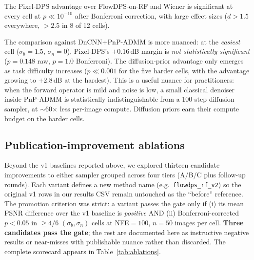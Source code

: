 \documentclass{article}
\begin{document}
The Pixel-DPS advantage over FlowDPS-on-RF and Wiener is significant
at every cell at $p \ll 10^{-10}$ after Bonferroni correction, with
large effect sizes ($d > 1.5$ everywhere, $> 2.5$ in 8 of 12 cells).

The comparison against DnCNN$+$PnP-ADMM is more nuanced: at the
\emph{easiest} cell ($\sigma_b{=}1.5$, $\sigma_n{=}0$), Pixel-DPS's
$+0.16$\,dB margin is \emph{not statistically significant}
($p{=}0.148$ raw, $p{=}1.0$ Bonferroni). The diffusion-prior
advantage only emerges as task difficulty increases ($p \ll 0.001$
for the five harder cells, with the advantage growing to $+2.8$\,dB
at the hardest). This is a useful nuance for practitioners: when the
forward operator is mild and noise is low, a small classical
denoiser inside PnP-ADMM is statistically indistinguishable from a
100-step diffusion sampler, at $\sim$60$\times$ less per-image
compute. Diffusion priors earn their compute budget on the
harder cells.

\subsection{Publication-improvement ablations}\label{sec:ablations}

Beyond the v1 baselines reported above, we explored thirteen
candidate improvements to either sampler grouped across four tiers
(A/B/C plus follow-up rounds). Each variant defines a new method
name (e.g.\ \texttt{flowdps\_rf\_v2}) so the original v1 rows in our
results CSV remain untouched as the ``before'' reference. The promotion
criterion was strict: a variant passes the gate only if (i) its mean
PSNR difference over the v1 baseline is \emph{positive} AND
(ii) Bonferroni-corrected $p < 0.05$ in $\geq 4/6$
$(\sigma_b, \sigma_n)$ cells at NFE${=}100$, $n{=}50$ images per cell.
\textbf{Three candidates pass the gate}; the rest are documented here
as instructive negative results or near-misses with publishable
nuance rather than discarded. The complete scorecard appears in
Table~\ref{tab:ablations}.
\end{document}
